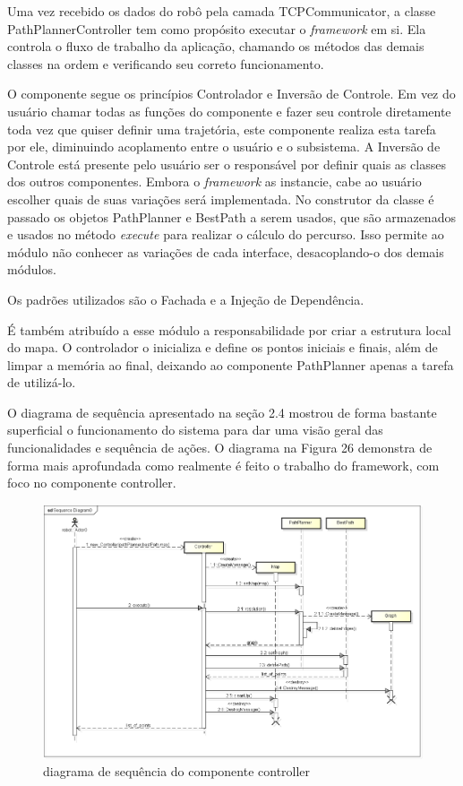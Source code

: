 Uma vez recebido os dados do robô pela camada TCPCommunicator, a classe PathPlannerController tem como propósito executar o \textit{framework} em si. Ela controla o fluxo de trabalho da aplicação, chamando os métodos das demais classes na ordem e verificando seu correto funcionamento.

O componente segue os princípios Controlador e Inversão de Controle. Em vez do usuário chamar todas as funções do componente e fazer seu controle diretamente toda vez que quiser definir uma trajetória, este componente realiza esta tarefa por ele, diminuindo acoplamento entre o usuário e o subsistema. A Inversão de Controle está presente pelo usuário ser o responsável por definir quais as classes dos outros componentes. Embora o \textit{framework} as instancie, cabe ao usuário escolher quais de suas variações será implementada. No construtor da classe é passado os objetos PathPlanner e BestPath a serem usados, que são armazenados e usados no método \textit{execute} para realizar o cálculo do percurso. Isso permite ao módulo não conhecer as variações de cada interface, desacoplando-o dos demais módulos.

Os padrões utilizados são o Fachada e a Injeção de Dependência.

É também atribuído a esse módulo a responsabilidade por criar a estrutura local do mapa. O controlador o inicializa e define os pontos iniciais e finais, além de limpar a memória ao final, deixando ao componente PathPlanner apenas a tarefa de utilizá-lo.

O diagrama de sequência apresentado na seção 2.4 mostrou de forma bastante superficial o funcionamento do sistema para dar uma visão geral das funcionalidades e sequência de ações. O diagrama na Figura 26 demonstra de forma mais aprofundada como realmente é feito o trabalho do framework, com foco no componente controller.

\begin{figure}[h]
	\centering
	\label{fig26}
		\includegraphics[keepaspectratio=true,scale=0.4]{figuras/executeController.png}
	\caption{diagrama de sequência do componente controller}
\end{figure}

